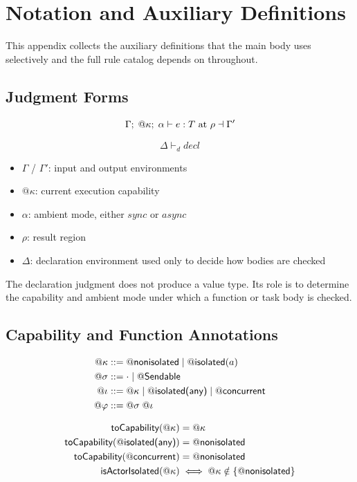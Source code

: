 \section{Notation and Auxiliary Definitions}
\label{sec:appendix-notation}

This appendix collects the auxiliary definitions that the main body uses selectively and the full rule catalog depends on throughout.

\subsection{Judgment Forms}

\[
  \Gamma;\; @\kappa;\; \alpha \vdash e : T \text{ at } \rho \dashv \Gamma'
\]

\[
  \Delta \vdash_d \mathit{decl}
\]

\begin{itemize}
  \item $\Gamma$ / $\Gamma'$: input and output environments
  \item $@\kappa$: current execution capability
  \item $\alpha$: ambient mode, either $\mathit{sync}$ or $\mathit{async}$
  \item $\rho$: result region
  \item $\Delta$: declaration environment used only to decide how bodies are checked
\end{itemize}

The declaration judgment does not produce a value type. Its role is to determine the capability and ambient mode under which a function or task body is checked.

\subsection{Capability and Function Annotations}

\[
\begin{aligned}
  @\kappa &::= @\textsf{nonisolated} \mid @\textsf{isolated}(a) \\
  @\sigma &::= \cdot \mid @\textsf{Sendable} \\
  @\iota &::= @\kappa \mid @\textsf{isolated(any)} \mid @\textsf{concurrent} \\
  @\varphi &::= @\sigma\; @\iota
\end{aligned}
\]

\[
\begin{aligned}
  \textsf{toCapability}(@\kappa) &= @\kappa \\
  \textsf{toCapability}(@\textsf{isolated(any)}) &= @\textsf{nonisolated} \\
  \textsf{toCapability}(@\textsf{concurrent}) &= @\textsf{nonisolated} \\
  \textsf{isActorIsolated}(@\kappa) &\iff @\kappa \notin \{@\textsf{nonisolated}\}
\end{aligned}
\]

